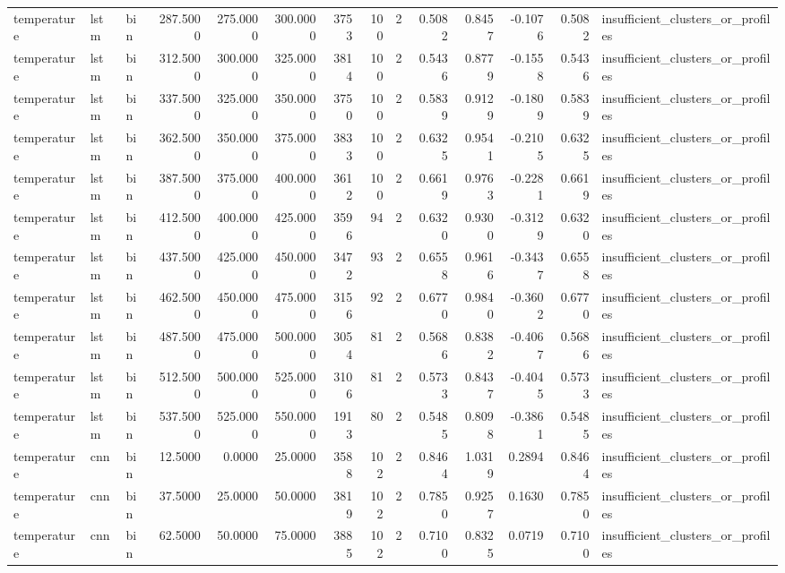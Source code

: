 \begin{tabular}{lllrrrrrrrrrrl}
temperature & lstm & bin & 287.5000 & 275.0000 & 300.0000 & 3753 & 100 & 2 & 0.5082 & 0.8457 & -0.1076 & 0.5082 & insufficient_clusters_or_profiles \\
temperature & lstm & bin & 312.5000 & 300.0000 & 325.0000 & 3814 & 100 & 2 & 0.5436 & 0.8779 & -0.1558 & 0.5436 & insufficient_clusters_or_profiles \\
temperature & lstm & bin & 337.5000 & 325.0000 & 350.0000 & 3750 & 100 & 2 & 0.5839 & 0.9129 & -0.1809 & 0.5839 & insufficient_clusters_or_profiles \\
temperature & lstm & bin & 362.5000 & 350.0000 & 375.0000 & 3833 & 100 & 2 & 0.6325 & 0.9541 & -0.2105 & 0.6325 & insufficient_clusters_or_profiles \\
temperature & lstm & bin & 387.5000 & 375.0000 & 400.0000 & 3612 & 100 & 2 & 0.6619 & 0.9763 & -0.2281 & 0.6619 & insufficient_clusters_or_profiles \\
temperature & lstm & bin & 412.5000 & 400.0000 & 425.0000 & 3596 & 94 & 2 & 0.6320 & 0.9300 & -0.3129 & 0.6320 & insufficient_clusters_or_profiles \\
temperature & lstm & bin & 437.5000 & 425.0000 & 450.0000 & 3472 & 93 & 2 & 0.6558 & 0.9616 & -0.3437 & 0.6558 & insufficient_clusters_or_profiles \\
temperature & lstm & bin & 462.5000 & 450.0000 & 475.0000 & 3156 & 92 & 2 & 0.6770 & 0.9840 & -0.3602 & 0.6770 & insufficient_clusters_or_profiles \\
temperature & lstm & bin & 487.5000 & 475.0000 & 500.0000 & 3054 & 81 & 2 & 0.5686 & 0.8382 & -0.4067 & 0.5686 & insufficient_clusters_or_profiles \\
temperature & lstm & bin & 512.5000 & 500.0000 & 525.0000 & 3106 & 81 & 2 & 0.5733 & 0.8437 & -0.4045 & 0.5733 & insufficient_clusters_or_profiles \\
temperature & lstm & bin & 537.5000 & 525.0000 & 550.0000 & 1913 & 80 & 2 & 0.5485 & 0.8098 & -0.3861 & 0.5485 & insufficient_clusters_or_profiles \\
temperature & cnn & bin & 12.5000 & 0.0000 & 25.0000 & 3588 & 102 & 2 & 0.8464 & 1.0319 & 0.2894 & 0.8464 & insufficient_clusters_or_profiles \\
temperature & cnn & bin & 37.5000 & 25.0000 & 50.0000 & 3819 & 102 & 2 & 0.7850 & 0.9257 & 0.1630 & 0.7850 & insufficient_clusters_or_profiles \\
temperature & cnn & bin & 62.5000 & 50.0000 & 75.0000 & 3885 & 102 & 2 & 0.7100 & 0.8325 & 0.0719 & 0.7100 & insufficient_clusters_or_profiles \\

\end{tabular}
